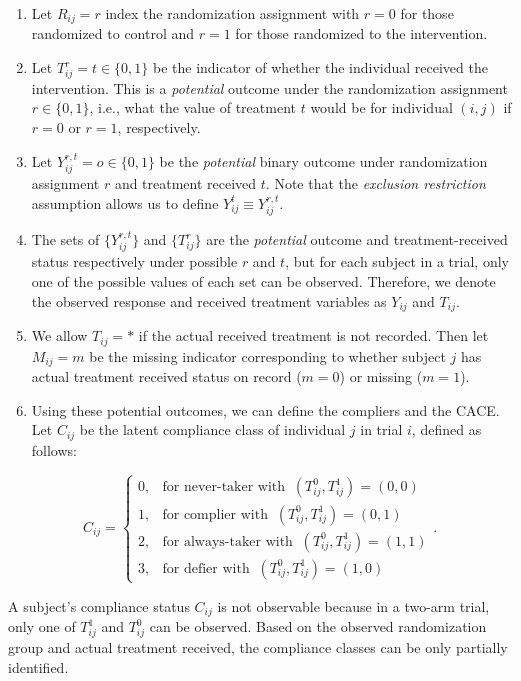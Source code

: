 \begin{enumerate}
\def\labelenumi{\arabic{enumi}.}
\tightlist
\item
  Let \(R_{ij}=r\) index the randomization assignment with \(r=0\) for those randomized to control and \(r=1\) for those randomized to the intervention.
\item
  Let \(T^{r}_{ij}=t \in \{0, 1\}\) be the indicator of whether the individual received the intervention. This is a \emph{potential} outcome under the randomization assignment \(r\in \{0, 1\}\), i.e., what the value of treatment \(t\) would be for individual \((i,j)\) if \(r=0\) or \(r=1\), respectively.
\item
  Let \(Y^{r, t}_{ij}=o \in \{0, 1\}\) be the \emph{potential} binary outcome under randomization assignment \(r\) and treatment received \(t\). Note that the \textit{exclusion restriction} assumption allows us to define \(Y^{t}_{ij}\equiv Y^{r, t}_{ij}\).
\item
  The sets of \(\{Y^{r, t}_{ij}\}\) and \(\{T^{r}_{ij}\}\) are the \emph{potential} outcome and treatment-received status respectively under possible \(r\) and \(t\), but for each subject in a trial, only one of the possible values of each set can be observed. Therefore, we denote the observed response and received treatment variables as \(Y_{ij}\) and \(T_{ij}\).
\item
  We allow \(T_{ij}=*\) if the actual received treatment is not recorded. Then let \(M_{ij}=m\) be the missing indicator corresponding to whether subject \(j\) has actual treatment received status on record (\(m=0\)) or missing (\(m=1\)).
\item
  Using these potential outcomes, we can define the compliers and the CACE. Let \(C_{ij}\) be the latent compliance class of individual \(j\) in trial \(i\), defined as follows:
\end{enumerate}

\[
   C_{ij}=
   \begin{cases}
     0, & \text{for never-taker with }\ (T^0_{ij}, T^1_{ij})=(0, 0) \\
     1, & \text{for complier with }\ (T^0_{ij}, T^1_{ij})=(0, 1) \\
     2, & \text{for always-taker with }\ (T^0_{ij}, T^1_{ij})=(1, 1) \\
     3, & \text{for defier with }\ (T^0_{ij}, T^1_{ij})=(1, 0)
   \end{cases}.
 \]

A subject's compliance status \(C_{ij}\) is not observable because in a two-arm trial, only one of \(T^1_{ij}\) and \(T^0_{ij}\) can be observed. Based on the observed randomization group and actual treatment received, the compliance classes can be only partially identified.

